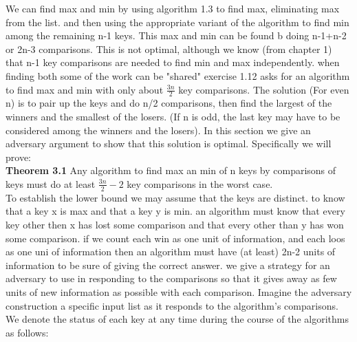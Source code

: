 \documentclass[a4paper,10pt,titlepage]{report}
\begin{document}
We can find max and min by using algorithm 1.3 to find max, eliminating max from the list. and then using the appropriate variant of the algorithm to find min among the remaining n-1 keys. This max and min can be found b doing n-1+n-2 or 2n-3 comparisons. This is not optimal, although we know (from chapter 1) that n-1 key comparisons are needed to find min and max independently. when finding both some of the work can be "shared" exercise 1.12 asks for an algorithm to find max and min with only about $\frac{3n}{2}$ key comparisons. The solution (For even n) is to pair up the keys and do n/2 comparisons, then find the largest of the winners and the smallest of the losers. (If n is odd, the last key may have to be considered among the winners and the losers). In this section we give an adversary argument to show that this solution is optimal. Specifically we will prove:\\
\vspace{5mm}
\textbf{Theorem 3.1} Any algorithm to find max an min of n keys by comparisons of keys must do at least $\frac{3n}{2}-2$ key comparisons in the worst case.\\
\vspace{5mm}
To establish the lower bound we may assume that the keys are distinct. to know that a key x is max and that a key y is min. an algorithm must know that every key other then x has lost some comparison and that every other than y has won some comparison. if we count each win as one unit of information, and each loos as one uni of information then an algorithm must have (at least) 2n-2 units of information to be sure of giving the correct answer. we give a strategy for an adversary to use in responding to the comparisons so that it gives away as few units of new information as possible with each comparison. Imagine the adversary construction a specific input list as it responds to the algorithm's comparisons.\\
We denote the status of each key at any time during the course of the algorithms as follows:\\
\end{document}

